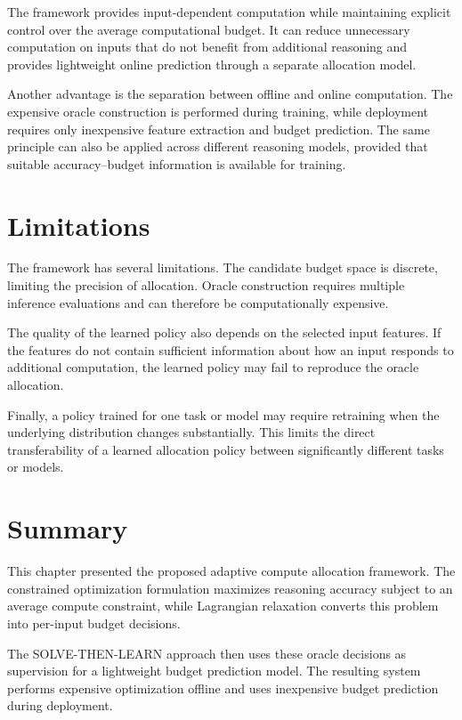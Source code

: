 \documentclass[12pt,a4paper,titlepage]{report}
\begin{document}
The framework provides input-dependent computation while maintaining explicit control over the average computational budget. It can reduce unnecessary computation on inputs that do not benefit from additional reasoning and provides lightweight online prediction through a separate allocation model.

Another advantage is the separation between offline and online computation. The expensive oracle construction is performed during training, while deployment requires only inexpensive feature extraction and budget prediction. The same principle can also be applied across different reasoning models, provided that suitable accuracy--budget information is available for training.

\section{Limitations}

The framework has several limitations. The candidate budget space is discrete, limiting the precision of allocation. Oracle construction requires multiple inference evaluations and can therefore be computationally expensive.

The quality of the learned policy also depends on the selected input features. If the features do not contain sufficient information about how an input responds to additional computation, the learned policy may fail to reproduce the oracle allocation.

Finally, a policy trained for one task or model may require retraining when the underlying distribution changes substantially. This limits the direct transferability of a learned allocation policy between significantly different tasks or models.

\section{Summary}

This chapter presented the proposed adaptive compute allocation framework. The constrained optimization formulation maximizes reasoning accuracy subject to an average compute constraint, while Lagrangian relaxation converts this problem into per-input budget decisions.

The SOLVE-THEN-LEARN approach then uses these oracle decisions as supervision for a lightweight budget prediction model. The resulting system performs expensive optimization offline and uses inexpensive budget prediction during deployment.
\end{document}
